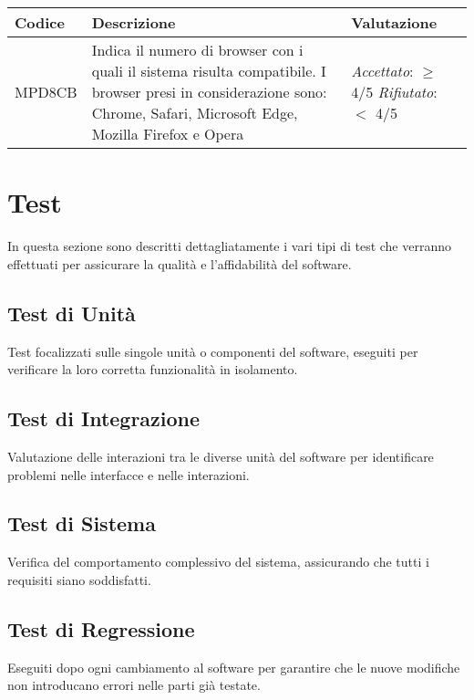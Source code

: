 \begin{table}[h]
\centering
\begin{tabular}{ |>{\centering\arraybackslash}m{3cm}|>{\centering\arraybackslash}m{10cm}|>{\centering\arraybackslash}m{3cm}| }
\hline
Codice & Descrizione & Valutazione\\
\hline
MPD8CB & Indica il numero di browser con i quali il sistema risulta compatibile. I browser presi in considerazione sono: Chrome, Safari, Microsoft Edge, Mozilla Firefox e Opera&
\textit{Accettato}:  $\geq$ 4/5
\textit{Rifiutato}:  $<$ 4/5 \\
\hline
\end{tabular}
\end{table}

\newpage
\section{Test}
\par In questa sezione sono descritti dettagliatamente i vari tipi di test che verranno effettuati per assicurare la qualità e l'affidabilità del software.

\subsection{Test di Unità}
\par Test focalizzati sulle singole unità o componenti del software, eseguiti per verificare la loro corretta funzionalità in isolamento.

\subsection{Test di Integrazione}
\par Valutazione delle interazioni tra le diverse unità del software per identificare problemi nelle interfacce e nelle interazioni.

\subsection{Test di Sistema}
\par Verifica del comportamento complessivo del sistema, assicurando che tutti i requisiti siano soddisfatti.

\subsection{Test di Regressione}
\par Eseguiti dopo ogni cambiamento al software per garantire che le nuove modifiche non introducano errori nelle parti già testate.

